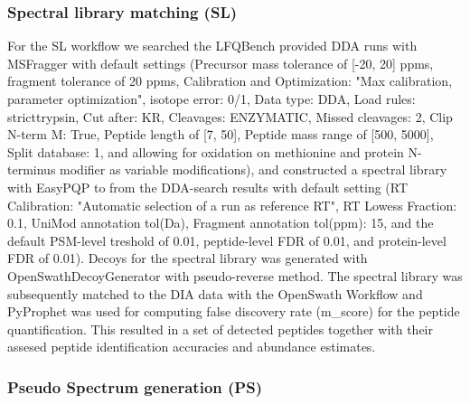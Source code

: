 \documentclass[10pt,letterpaper]{article}
\begin{document}
\subsubsection*{Spectral library matching (SL)}

For the SL workflow we searched the LFQBench provided DDA runs with MSFragger\cite{kong2017msfragger} with default settings (Precursor mass tolerance of [-20, 20] ppms, fragment tolerance of 20 ppms, Calibration and Optimization: "Max calibration, parameter optimization", isotope error: 0/1, Data type: DDA, Load rules: stricttrypsin, Cut after: KR, Cleavages: ENZYMATIC, Missed cleavages: 2, Clip N-term M: True, Peptide length of [7, 50], Peptide mass range of [500, 5000], Split database: 1, and allowing for oxidation on methionine and protein N-terminus modifier as variable modifications), and constructed a spectral library with EasyPQP \cite{easypqp} to from the DDA-search results with default setting (RT Calibration: "Automatic selection of a run as reference RT", RT Lowess Fraction: 0.1, UniMod annotation tol(Da), Fragment annotation tol(ppm): 15, and the default PSM-level treshold of 0.01, peptide-level FDR of 0.01, and protein-level FDR of 0.01). Decoys for the spectral library was generated with OpenSwathDecoyGenerator with pseudo-reverse method. The spectral library was subsequently matched to the DIA data with the OpenSwath Workflow and  PyProphet\cite{teleman2015diana} was used for computing false discovery rate (m\_score) for the peptide quantification. This resulted in a set of detected peptides together with their assesed peptide identification accuracies and abundance estimates.



\subsubsection*{Pseudo Spectrum generation (PS)}
\end{document}
